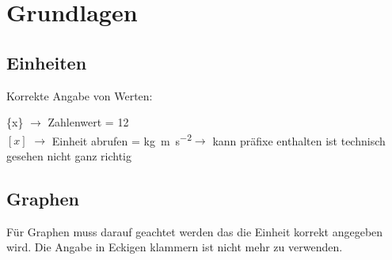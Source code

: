 \section{Grundlagen}

\subsection{Einheiten}

Korrekte Angabe von Werten:\\
\noindent
\begin{minipage}{0.5\columnwidth}
    
\end{minipage}
\begin{minipage}{0.5\columnwidth}
    \{x\} $\rightarrow$ Zahlenwert = 12\\
    $[x]$ $\rightarrow$ Einheit abrufen = \unit{\kilo\gram\metre\per\square\second}$\rightarrow$ kann präfixe enthalten ist technisch gesehen nicht ganz richtig\\
\end{minipage}

\subsection{Graphen}
\begin{center}
    
\end{center}
Für Graphen muss darauf geachtet werden das die Einheit korrekt angegeben wird. 
Die Angabe in Eckigen klammern ist nicht mehr zu verwenden. 
